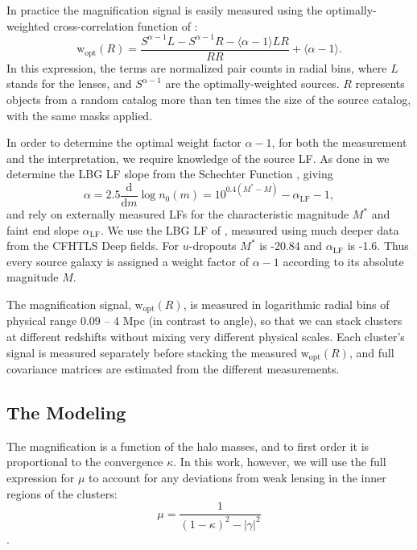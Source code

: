 In practice the magnification signal is easily measured using the optimally-weighted cross-correlation function of \citet{Menard03}:
\begin{equation}
\mathrm{w}_{\mathrm{opt}}(R)=\frac{S^{\alpha-1} L - S^{\alpha-1} R - \langle \alpha-1 \rangle LR}{RR} + \langle \alpha-1 \rangle.
\end{equation}
In this expression, the terms are normalized pair counts in radial bins, where $L$ stands for the lenses, and $S^{\alpha-1}$ are the optimally-weighted sources. $R$ represents objects from a random catalog more than ten times the size of the source catalog, with the same masks applied.

In order to determine the optimal weight factor $\alpha-1$, for both the measurement and the interpretation, we require knowledge of the source \ac{LF}. As done in \citet{Ford12} we determine the \ac{LBG} \ac{LF} slope from the Schechter Function \citep{Schechter76}, giving
\begin{equation}
\alpha = 2.5 \frac{\mathrm{d}}{\mathrm{d}m}\log n_0(m) = 10^{0.4(M^\ast-M)}-\alpha_{\mathrm{LF}}-1,
\end{equation}
and rely on externally measured \ac{LF}s for the characteristic magnitude $M^\ast$ and faint end slope $\alpha_{\mathrm{LF}}$. We use the \ac{LBG} \ac{LF} of \citet{vanderBurg10}, measured using much deeper data from the \ac{CFHTLS} Deep fields. For $u$-dropouts $M^\ast$ is -20.84 and $\alpha_{\mathrm{LF}}$ is -1.6. Thus every source galaxy is assigned a weight factor of $\alpha-1$ according to its absolute magnitude $M$.

The magnification signal, $\mathrm{w}_{\mathrm{opt}}(R)$, is measured in logarithmic radial bins of physical range 0.09 -- 4 Mpc (in contrast to angle), so that we can stack clusters at different redshifts without mixing very different physical scales. Each cluster's signal is measured separately before stacking the measured $\mathrm{w}_{\mathrm{opt}}(R)$, and full covariance matrices are estimated from the different measurements. 


\subsection{The Modeling}
\label{model}

The magnification is a function of the halo masses, and to first order it is proportional to the convergence $\kappa$. In this work, however, we will use the full expression for $\mu$ to account for any deviations from weak lensing in the inner regions of the clusters:
\begin{equation}
\mu = \frac{1}{(1-\kappa)^2 - \left|\gamma\right|^2}
\end{equation}
\citep{BS01}.

